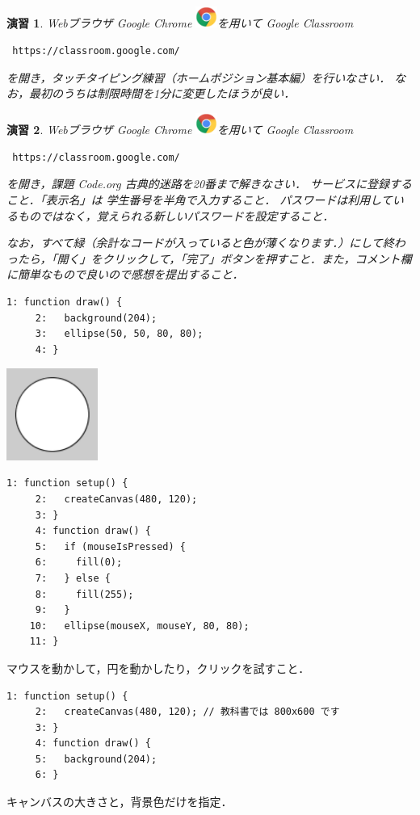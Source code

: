 \documentclass[a4j]{ltjsarticle}
\newtheorem{exercise}{演習}
\begin{document}
\begin{exercise}
Webブラウザ Google Chrome \includegraphics[width=7mm]{image/chrome_logo.png}を用いて
Google Classroom
\begin{lstlisting}
 https://classroom.google.com/
\end{lstlisting}
 を開き，タッチタイピング練習（ホームポジション基本編）を行いなさい．
なお，最初のうちは制限時間を1分に変更したほうが良い．
\end{exercise}

\begin{exercise}
Webブラウザ Google Chrome \includegraphics[width=7mm]{image/chrome_logo.png}を用いて
Google Classroom
\begin{lstlisting}
 https://classroom.google.com/
\end{lstlisting}
を開き，課題 Code.org 古典的迷路を20番まで解きなさい．
サービスに登録すること．「表示名」は 学生番号を半角で入力すること．
パスワードは利用しているものではなく，覚えられる新しいパスワードを設定すること．

なお，すべて緑（余計なコードが入っていると色が薄くなります．）にして終わったら，「開く」をクリックして，「完了」ボタンを押すこと．また，コメント欄に簡単なもので良いので感想を提出すること．
\end{exercise}

\begin{lstlisting}[caption=Ex\_02\_01.js]
     1: function draw() {
     2:   background(204);
     3:   ellipse(50, 50, 80, 80);
     4: }
\end{lstlisting}
\includegraphics[height=3cm]{image/Ex_02_01.pdf}
\begin{lstlisting}[caption=Ex\_02\_02.js]
     1: function setup() {
     2:   createCanvas(480, 120);
     3: }
     4: function draw() {
     5:   if (mouseIsPressed) {
     6:     fill(0);
     7:   } else {
     8:     fill(255);
     9:   }
    10:   ellipse(mouseX, mouseY, 80, 80);
    11: }
\end{lstlisting}
マウスを動かして，円を動かしたり，クリックを試すこと．
\vspace{1in}
\begin{lstlisting}[caption=Ex\_03\_01.js]
     1: function setup() {
     2:   createCanvas(480, 120); // 教科書では 800x600 です
     3: }
     4: function draw() {
     5:   background(204);
     6: }
\end{lstlisting}
キャンバスの大きさと，背景色だけを指定．
\end{document}

